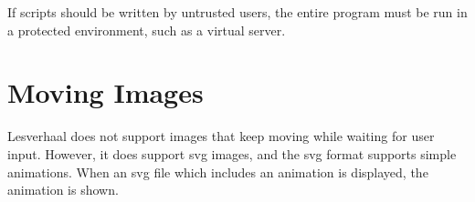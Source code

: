 \documentclass{article}
\begin{document}
If scripts should be written by untrusted users, the entire program must be run
in a protected environment, such as a virtual server.

\section{Moving Images}
Lesverhaal does not support images that keep moving while waiting for user
input. However, it does support svg images, and the svg format supports simple
animations. When an svg file which includes an animation is displayed, the
animation is shown.
\end{document}
